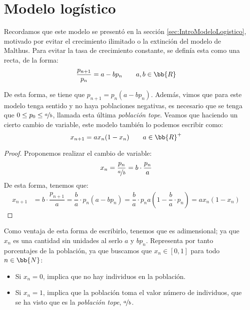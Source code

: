 \section{Modelo logístico}\label{sec:DesarrolloModeloLogistico}

Recordamos que este modelo se presentó en la sección \ref{sec:IntroModeloLogistico}, motivado por evitar el crecimiento ilimitado o la extinción del modelo de Malthus. Para evitar la tasa de crecimiento constante, se definía esta como una recta, de la forma:
\begin{equation*}
    \frac{p_{n+1}}{p_n} = a-bp_n \qquad a,b\in \bb{R}
\end{equation*}

De esta forma, se tiene que $p_{n+1}=p_n(a-bp_n)$.
Además, vimos que para este modelo tenga sentido y no haya poblaciones negativas, es necesario que se tenga que $0\leq p_0\leq \nicefrac{a}{b}$, llamada esta última \emph{población tope}. Veamos que haciendo un cierto cambio de variable, este modelo también lo podemos escribir como:
$$x_{n+1} = ax_n(1-x_n)\qquad a\in \bb{R}^+$$
\begin{proof}
    Proponemos realizar el cambio de variable:
    \begin{equation*}
        x_n = \dfrac{p_n}{\nicefrac{a}{b}} = b\cdot \dfrac{p_n}{a}
    \end{equation*}
    De esta forma, tenemos que:
    \begin{align*}
        x_{n+1} &= b\cdot \dfrac{p_{n+1}}{a} = \dfrac{b}{a}\cdot p_n(a-bp_n) = \dfrac{b}{a}\cdot p_n {a}\left(1-\dfrac{b}{a}\cdot p_n\right) = ax_n (1-x_n)
    \end{align*}
\end{proof}

Como ventaja de esta forma de escribirlo, tenemos que es adimensional; ya que $x_n$ es una cantidad sin unidades al serlo $a$ y $bp_n$. Representa por tanto porcentajes de la población, ya que buscamos que $x_n\in [0,1]$ para todo $n\in \bb{N}$:
\begin{itemize}
    \item Si $x_n=0$, implica que no hay individuos en la población.
    \item Si $x_n=1$, implica que la población toma el valor número de individuos, que se ha visto que es la \emph{población tope}, $\nicefrac{a}{b}$.
\end{itemize}

